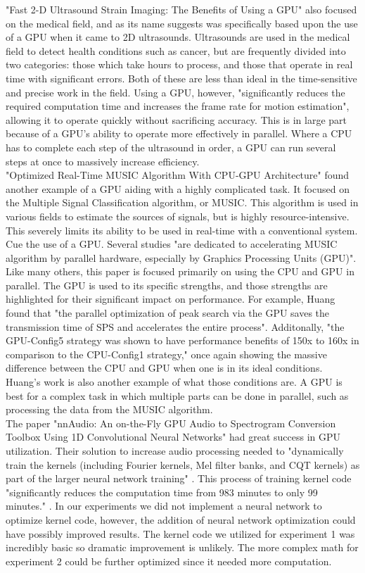 \documentclass[conference]{IEEEtran}
\begin{document}
"Fast 2-D Ultrasound Strain Imaging: The Benefits of Using a GPU" also focused on the medical field, and as its name suggests was specifically based upon the use of a GPU when it came to 2D ultrasounds. Ultrasounds are used in the medical field to detect health conditions such as cancer, but are frequently divided into two categories: those which take hours to process, and those that operate in real time with significant errors. Both of these are less than ideal in the time-sensitive and precise work in the field. Using a GPU, however, "significantly reduces the required computation time and increases the frame rate for motion estimation", allowing it to operate quickly without sacrificing accuracy. This is in large part because of a GPU's ability to operate more effectively in parallel. Where a CPU has to complete each step of the ultrasound in order, a GPU can run several steps at once to massively increase efficiency.\\
"Optimized Real-Time MUSIC Algorithm With CPU-GPU Architecture" found another example of a GPU aiding with a highly complicated task. It focused on the Multiple Signal Classification algorithm, or MUSIC. This algorithm is used in various fields to estimate the sources of signals, but is highly resource-intensive. This severely limits its ability to be used in real-time with a conventional system. Cue the use of a GPU. Several studies "are dedicated to accelerating MUSIC algorithm by parallel hardware, especially by Graphics Processing Units (GPU)"\cite{Huang}. Like many others, this paper is focused primarily on using the CPU and GPU in parallel. The GPU is used to its specific strengths, and those strengths are highlighted for their significant impact on performance. For example, Huang found that "the parallel optimization of peak search via the GPU saves the transmission time of SPS and accelerates the entire process"\cite{Huang}. Additonally, "the GPU-Config5 strategy was shown to have performance benefits of 150x to 160x in comparison to the CPU-Config1 strategy," once again showing the massive difference between the CPU and GPU when one is in its ideal conditions\cite{Huang}. Huang's work is also another example of what those conditions are. A GPU is best for a complex task in which multiple parts can be done in parallel, such as processing the data from the MUSIC algorithm.\\
The paper "nnAudio: An on-the-Fly GPU Audio to Spectrogram Conversion Toolbox Using 1D Convolutional Neural Networks" had great success in GPU utilization. Their solution to increase audio processing needed to "dynamically train the kernels (including Fourier kernels, Mel filter banks, and CQT kernels) as part of the larger neural network training" \cite{Cheuk}. This process of training kernel code "significantly reduces the computation time from 983 minutes to only 99 minutes." \cite{Cheuk}. In our experiments we did not implement a neural network to optimize kernel code, however, the addition of neural network optimization could have possibly improved results. The kernel code we utilized for experiment 1 was incredibly basic so dramatic improvement is unlikely. The more complex math for experiment 2 could be further optimized since it needed more computation.\\
\end{document}
